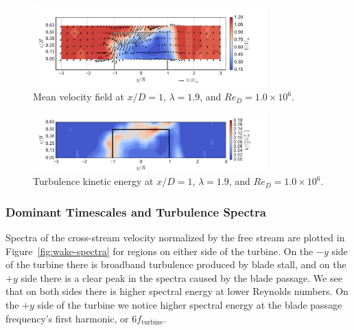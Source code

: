 \documentclass[energies,article,accept,moreauthors,pdftex,12pt,a4paper]{mdpi}
\begin{document}
\begin{figure}[ht!]
\centering
\includegraphics[width=0.8\textwidth]{figures/meancontquiv_10}
\caption{Mean velocity field at $x/D=1$, $\lambda=1.9$, and $Re_D=1.0 \times 10^6$.}
\label{fig:meancontquiv}
\end{figure}

\begin{figure}[ht!]
\centering
\includegraphics[width=0.8\textwidth]{figures/k_contours_10}
\caption{Turbulence kinetic energy at $x/D=1$, $\lambda=1.9$, and 
$Re_D=1.0 \times 10^6$.}
\label{fig:kcont}
\end{figure}


\subsubsection{Dominant Timescales and Turbulence Spectra}

Spectra of the cross-stream velocity normalized by the free stream are plotted
in Figure~\ref{fig:wake-spectra} for regions on either side of the turbine. On
the $-y$ side of the turbine there is broadband turbulence produced by blade
stall, and on the $+y$ side there is a clear peak in the spectra caused by the
blade passage. We see that on both sides there is higher spectral energy at
lower Reynolds numbers. On the $+y$ side of the turbine we notice higher
spectral energy at the blade passage frequency's first harmonic, or $6
f_\mathrm{turbine}$.


\end{document}
